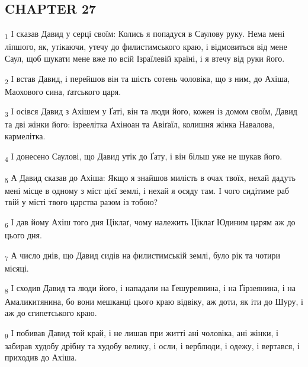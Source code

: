 \subsection{CHAPTER 27}
\begin{tcolorbox}
\textsubscript{1} І сказав Давид у серці своїм: Колись я попадуся в Саулову руку. Нема мені ліпшого, як, утікаючи, утечу до филистимського краю, і відмовиться від мене Саул, щоб шукати мене вже по всій Ізраїлевій країні, і я втечу від руки його.
\end{tcolorbox}
\begin{tcolorbox}
\textsubscript{2} І встав Давид, і перейшов він та шість сотень чоловіка, що з ним, до Ахіша, Маохового сина, ґатського царя.
\end{tcolorbox}
\begin{tcolorbox}
\textsubscript{3} І осівся Давид з Ахішем у Ґаті, він та люди його, кожен із домом своїм, Давид та дві жінки його: ізреелітка Ахіноан та Авіґаїл, колишня жінка Навалова, кармелітка.
\end{tcolorbox}
\begin{tcolorbox}
\textsubscript{4} І донесено Саулові, що Давид утік до Ґату, і він більш уже не шукав його.
\end{tcolorbox}
\begin{tcolorbox}
\textsubscript{5} А Давид сказав до Ахіша: Якщо я знайшов милість в очах твоїх, нехай дадуть мені місце в одному з міст цієї землі, і нехай я осяду там. І чого сидітиме раб твій у місті твого царства разом із тобою?
\end{tcolorbox}
\begin{tcolorbox}
\textsubscript{6} І дав йому Ахіш того дня Ціклаґ, чому належить Ціклаґ Юдиним царям аж до цього дня.
\end{tcolorbox}
\begin{tcolorbox}
\textsubscript{7} А число днів, що Давид сидів на филистимській землі, було рік та чотири місяці.
\end{tcolorbox}
\begin{tcolorbox}
\textsubscript{8} І сходив Давид та люди його, і нападали на Ґешуреянина, і на Ґірзеянина, і на Амаликитянина, бо вони мешканці цього краю відвіку, аж доти, як іти до Шуру, і аж до єгипетського краю.
\end{tcolorbox}
\begin{tcolorbox}
\textsubscript{9} І побивав Давид той край, і не лишав при житті ані чоловіка, ані жінки, і забирав худобу дрібну та худобу велику, і осли, і верблюди, і одежу, і вертався, і приходив до Ахіша.
\end{tcolorbox}
